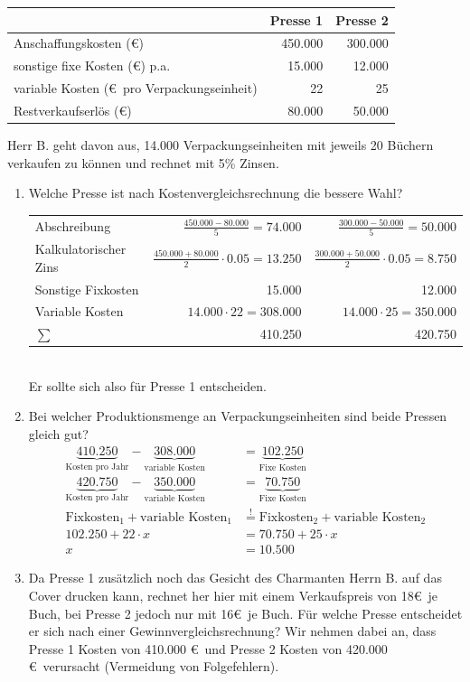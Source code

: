 \documentclass[11pt, a4paper]{article}
\begin{document}
\vspace{\baselineskip}
\begin{tabular}{l|r|r}
	& Presse 1 & Presse 2 \\ \hline
	Anschaffungskosten (\euro) & 450.000 & 300.000 \\
	sonstige fixe Kosten (\euro) p.a. & 15.000 & 12.000 \\
	variable Kosten (\euro \ pro Verpackungseinheit) & 22 & 25 \\
	Restverkaufserlös (\euro) & 80.000 & 50.000
\end{tabular}

\vspace{\baselineskip}
Herr B. geht davon aus, 14.000 Verpackungseinheiten mit jeweils 20 Büchern verkaufen zu können und rechnet mit 5\% Zinsen.

\begin{enumerate}
	\item Welche Presse ist nach Kostenvergleichsrechnung die bessere Wahl? \\
		\begin{tabular}{lr|r}
			Abschreibung & $\frac{450.000 - 80.000}{5} = 74.000$ & $\frac{300.000 - 50.000}{5} = 50.000$ \\
			Kalkulatorischer Zins & $\frac{450.000 + 80.000}{2} \cdot 0.05 = 13.250$ & $\frac{300.000 + 50.000}{2} \cdot 0.05 = 8.750$ \\
			Sonstige Fixkosten & 15.000 & 12.000 \\
			Variable Kosten & $14.000 \cdot 22 = 308.000$ & $14.000 \cdot 25 = 350.000$ \\ \hline
			$\sum$ & 410.250 & 420.750
		\end{tabular}
		\vspace{\baselineskip} \\
		Er sollte sich also für Presse 1 entscheiden.
	\item Bei welcher Produktionsmenge an Verpackungseinheiten sind beide Pressen gleich gut?
		\begin{align*}
		\underbrace{410.250}_{\text{Kosten pro Jahr}} - \underbrace{308.000}_{\text{variable Kosten}} &= \underbrace{102.250}_{\text{Fixe Kosten}} \tag{Maschine 1} \\
		\underbrace{420.750}_{\text{Kosten pro Jahr}} - \underbrace{350.000}_{\text{variable Kosten}} &= \underbrace{70.750}_{\text{Fixe Kosten}} \tag{Maschine 2} \\
		\text{Fixkosten}_1 + \text{variable Kosten}_1 &\overset{!}{=} \text{Fixkosten}_2 + \text{variable Kosten}_2 \\
		102.250 + 22 \cdot x &= 70.750 + 25 \cdot x \\
		x &= 10.500
		\end{align*}
	\item Da Presse 1 zusätzlich noch das Gesicht des Charmanten Herrn B. auf das Cover drucken kann, rechnet her hier mit einem Verkaufspreis von 18\euro \ je Buch, bei Presse 2 jedoch nur mit 16\euro \ je Buch. Für welche Presse entscheidet er sich nach einer Gewinnvergleichsrechnung? Wir nehmen dabei an, dass Presse 1 Kosten von 410.000 \euro \ und Presse 2 Kosten von 420.000 \euro \ verursacht (Vermeidung von Folgefehlern).
	

\end{enumerate}
\end{document}

